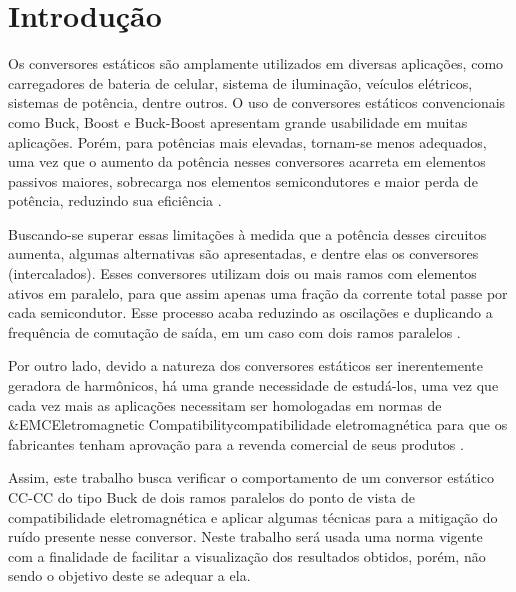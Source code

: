 \chapter{Introdução}
    
    Os conversores estáticos são amplamente utilizados em diversas aplicações, como carregadores de bateria de celular, sistema de iluminação, veículos elétricos, sistemas de potência, dentre outros. O uso de conversores estáticos convencionais como Buck, Boost e Buck-Boost apresentam grande usabilidade em muitas aplicações. Porém, para potências mais elevadas, tornam-se menos adequados, uma vez que o aumento da potência nesses conversores acarreta em elementos passivos maiores, sobrecarga nos elementos semicondutores e maior perda de potência, reduzindo sua eficiência \cite{ref:BI_artigo_Falcondes}.
    
    Buscando-se superar essas limitações à medida que a potência desses circuitos aumenta, algumas alternativas são apresentadas, e dentre elas os conversores \interleaved (intercalados). Esses conversores utilizam dois ou mais ramos com elementos ativos em paralelo, para que assim apenas uma fração da corrente total passe por cada semicondutor. Esse processo acaba reduzindo as oscilações e duplicando a frequência de comutação de saída, em um caso com dois ramos paralelos \cite{ref:BI_artigo_Falcondes}.
    
    Por outro lado, devido a natureza dos conversores estáticos ser inerentemente geradora de harmônicos, há uma grande necessidade de estudá-los, uma vez que cada vez mais as aplicações necessitam ser homologadas em normas de \abreviatura&{EMC}{Eletromagnetic Compatibility}{compatibilidade eletromagnética} para que os fabricantes tenham aprovação para a revenda comercial de seus produtos \cite{ref:EMC_artigo_Texas}.
    
    Assim, este trabalho busca verificar o comportamento de um conversor estático \mbox{CC-CC} do tipo Buck \interleaved de dois ramos paralelos do ponto de vista de compatibilidade eletromagnética e aplicar algumas técnicas para a mitigação do ruído presente nesse conversor. Neste trabalho será usada uma norma vigente com a finalidade de facilitar a visualização dos resultados obtidos, porém, não sendo o objetivo deste se adequar a ela.
    
